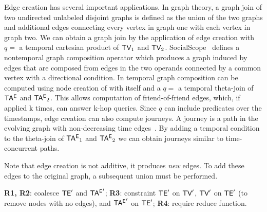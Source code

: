 Edge creation has several important applications.  In graph theory, a
graph join of two undirected unlabeled disjoint graphs is defined as
the union of the two graphs and additional edges connecting every
vertex in graph one with each vertex in graph two.  We can obtain a
graph join by the application of edge creation with $q = $ a temporal
cartesian product of $\textsf{TV}_1$ and $\textsf{TV}_2$.
SocialScope~\cite{Amer-Yahia2009} defines a nontemporal graph
composition operator which produces a graph induced by edges that are
composed from edges in the two operands connected by a common vertex
with a directional condition.  In \ql temporal graph composition can
be computed using node creation of \ttt with itself and a $q = $ a
temporal theta-join of $\mathsf{TA^{E}}$ and $\mathsf{TA^{E}}_2$.  This allows computation
of friend-of-friend edges, which, if applied k times, can answer k-hop
queries.  Since $q$ can include predicates over the timestamps, edge
creation can also compute journeys.  A journey is a path in the
evolving graph with non-decreasing time
edges~\cite{Ferreira2004,Casteigts2011}.  By adding a temporal
condition to the theta-join of $\mathsf{TA^{E}}_1$ and $\mathsf{TA^{E}}_2$ we can obtain
journeys similar to time-concurrent paths.

Note that edge creation is not additive, it produces {\em new} edges.
To add these edges to the original graph, a subsequent union must be
performed.




{\bf R1, R2}: coalesce $\textsf{TE}'$ and $\mathsf{TA^{E}}'$; {\bf R3}: constraint $\textsf{TE}'$
on $\textsf{TV}'$, $\textsf{TV}'$ on $\textsf{TE}'$ (to remove nodes with no edges), and
$\mathsf{TA^{E}}'$ on $\textsf{TE}'$; {\bf R4}: require reduce function.



%
